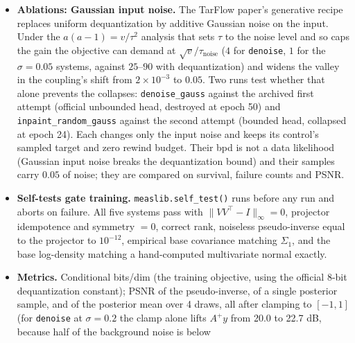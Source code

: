 \documentclass[11pt]{article}
\begin{document}
\begin{itemize}
        \texttt{inpaint\_random} (fixed 50\% pixel mask);
        \texttt{sr\_2x} / \texttt{sr\_4x} ($2\times2$ / $4\times4$ average
        pooling, where $V$ is the block Haar transform of step 6 and the null
        space is exactly the detail bands that downsampling discards). Masks
        are fixed rather than resampled per image: the system is known and
        fixed, as in the supervised bridge setting.
  \item \textbf{Ablations: Gaussian input noise.} The TarFlow paper's
        generative recipe replaces uniform dequantization by additive
        Gaussian noise on the input. Under the $a(a-1) = v/\tau^2$ analysis
        that sets $\tau$ to the noise level and so caps the gain the
        objective can demand at $\sqrt{v}/\tau_{\mathrm{noise}}$ ($4$ for
        \texttt{denoise}, $1$ for the $\sigma = 0.05$ systems, against
        $25$--$90$ with dequantization) and widens the valley in the
        coupling's shift from $2\times10^{-3}$ to $0.05$. Two runs test
        whether that alone prevents the collapses: \texttt{denoise\_gauss}
        against the archived first attempt (official unbounded head,
        destroyed at epoch 50) and \texttt{inpaint\_random\_gauss} against
        the second attempt (bounded head, collapsed at epoch 24). Each
        changes only the input noise and keeps its control's sampled target
        and zero rewind budget. Their bpd is not a data likelihood (Gaussian
        input noise breaks the dequantization bound) and their samples carry
        $0.05$ of noise; they are compared on survival, failure counts and
        PSNR.
  \item \textbf{Self-tests gate training.} \texttt{measlib.self\_test()} runs
        before any run and aborts on failure. All five systems pass with
        $\|VV^\top - I\|_\infty = 0$, projector idempotence and symmetry
        $= 0$, correct rank, noiseless pseudo-inverse equal to the projector
        to $10^{-12}$, empirical base covariance matching $\Sigma_1$, and the
        base log-density matching a hand-computed multivariate normal exactly.
  \item \textbf{Metrics.} Conditional bits/dim (the training objective, using
        the official 8-bit dequantization constant); PSNR of the
        pseudo-inverse, of a single posterior sample, and of the posterior
        mean over 4 draws, all after clamping to $[-1, 1]$ (for
        \texttt{denoise} at $\sigma = 0.2$ the clamp alone lifts $A^{+}y$
        from 20.0 to 22.7 dB, because half of the background noise is below

\end{itemize}
\end{document}
